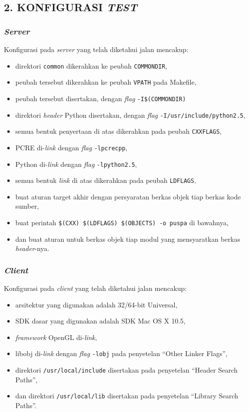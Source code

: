 \subsection*{\textcolor{subsectioncolor}{\textsf{2. KONFIGURASI \textit{TEST}}}}

\subsubsection*{\textit{Server}}
Konfigurasi pada \textit{server} yang telah diketahui jalan mencakup:
\begin{itemize}
\item direktori \texttt{common} dikerahkan ke peubah \texttt{COMMONDIR},
\item peubah tersebut dikerahkan ke peubah \texttt{VPATH} pada Makefile,
\item peubah tersebut disertakan, dengan \textit{flag} \verb!-I$(COMMONDIR)!
\item direktori \textit{header} Python disertakan, dengan \textit{flag} \texttt{-I/usr/include/python2.5},
\item semua bentuk penyertaan di atas dikerahkan pada peubah \texttt{CXXFLAGS},
\item PCRE di-\textit{link} dengan \textit{flag} \texttt{-lpcrecpp},
\item Python di-\textit{link} dengan \textit{flag} \texttt{-lpython2.5},
\item semua bentuk \textit{link} di atas dikerahkan pada peubah \texttt{LDFLAGS},
\item buat aturan target akhir dengan persyaratan berkas objek tiap berkas kode sumber,
\item buat perintah \verb!$(CXX) $(LDFLAGS) $(OBJECTS) -o puspa! di bawahnya,
\item dan buat aturan untuk berkas objek tiap modul yang mensyaratkan berkas \textit{header}-nya.
\end{itemize}

\subsubsection*{\textit{Client}}
Konfigurasi pada \textit{client} yang telah diketahui jalan mencakup:
\begin{itemize}
\item arsitektur yang digunakan adalah 32/64-bit Universal,
\item SDK dasar yang digunakan adalah SDK Mac OS X 10.5,
\item \textit{framework} OpenGL di-\textit{link},
\item libobj di-\textit{link} dengan \textit{flag} \texttt{-lobj} pada penyetelan ``Other Linker Flags'',
\item direktori \texttt{/usr/local/include} disertakan pada penyetelan ``Header Search Paths'',
\item dan direktori \texttt{/usr/local/lib} disertakan pada penyetelan ``Library Search Paths''.
\end{itemize}
